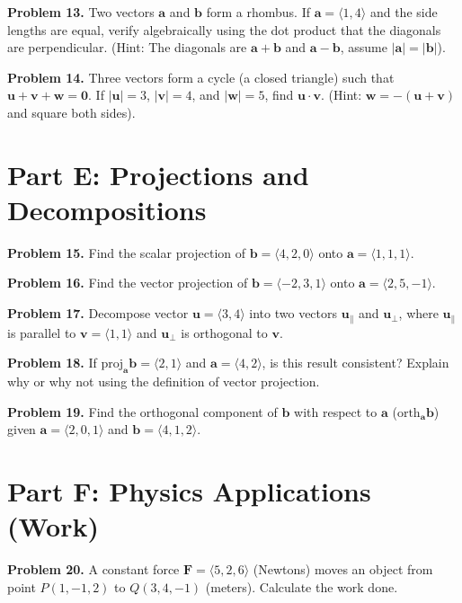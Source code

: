 \documentclass[12pt]{article}
\begin{document}
\textbf{Problem 13.} Two vectors $\mathbf{a}$ and $\mathbf{b}$ form a rhombus. If $\mathbf{a} = \langle 1, 4 \rangle$ and the side lengths are equal, verify algebraically using the dot product that the diagonals are perpendicular. (Hint: The diagonals are $\mathbf{a}+\mathbf{b}$ and $\mathbf{a}-\mathbf{b}$, assume $|\mathbf{a}| = |\mathbf{b}|$).

\textbf{Problem 14.} Three vectors form a cycle (a closed triangle) such that $\mathbf{u} + \mathbf{v} + \mathbf{w} = \mathbf{0}$. If $|\mathbf{u}|=3$, $|\mathbf{v}|=4$, and $|\mathbf{w}|=5$, find $\mathbf{u} \cdot \mathbf{v}$. (Hint: $\mathbf{w} = -(\mathbf{u}+\mathbf{v})$ and square both sides).

\section*{Part E: Projections and Decompositions}

\textbf{Problem 15.} Find the scalar projection of $\mathbf{b} = \langle 4, 2, 0 \rangle$ onto $\mathbf{a} = \langle 1, 1, 1 \rangle$.

\textbf{Problem 16.} Find the vector projection of $\mathbf{b} = \langle -2, 3, 1 \rangle$ onto $\mathbf{a} = \langle 2, 5, -1 \rangle$.

\textbf{Problem 17.} Decompose vector $\mathbf{u} = \langle 3, 4 \rangle$ into two vectors $\mathbf{u}_{\parallel}$ and $\mathbf{u}_{\perp}$, where $\mathbf{u}_{\parallel}$ is parallel to $\mathbf{v} = \langle 1, 1 \rangle$ and $\mathbf{u}_{\perp}$ is orthogonal to $\mathbf{v}$.

\textbf{Problem 18.} If $\text{proj}_{\mathbf{a}} \mathbf{b} = \langle 2, 1 \rangle$ and $\mathbf{a} = \langle 4, 2 \rangle$, is this result consistent? Explain why or why not using the definition of vector projection.

\textbf{Problem 19.} Find the orthogonal component of $\mathbf{b}$ with respect to $\mathbf{a}$ ($\text{orth}_{\mathbf{a}}\mathbf{b}$) given $\mathbf{a} = \langle 2, 0, 1 \rangle$ and $\mathbf{b} = \langle 4, 1, 2 \rangle$.

\section*{Part F: Physics Applications (Work)}

\textbf{Problem 20.} A constant force $\mathbf{F} = \langle 5, 2, 6 \rangle$ (Newtons) moves an object from point $P(1, -1, 2)$ to $Q(3, 4, -1)$ (meters). Calculate the work done.
\end{document}
